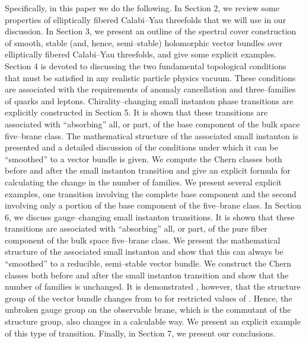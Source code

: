 \documentclass[a4paper,12pt]{article}
\numberwithin{equation}{section}
\theoremstyle{plain}
\begin{document}
Specifically, in this paper we do the following. In Section 2, we review some
properties of elliptically fibered Calabi--Yau threefolds that we will use in
our discussion. In Section 3, we present an outline of the spectral cover
construction of smooth, stable (and, hence, semi--stable) 
holomorphic \coordHE{} vector bundles over elliptically
fibered Calabi--Yau threefolds, and give some explicit examples. Section 4 is
devoted to discussing the two fundamental topological conditions that must be
satisfied in any realistic particle physics vacuum. These conditions are
associated with the requirements of anomaly cancellation and 
three--families of quarks and leptons. Chirality--changing small instanton
phase transitions are explicitly constructed in Section 5. It is shown that
these transitions are associated with ``absorbing'' all, or part, of the
base component of the bulk space five--brane class. The mathematical
structure of the associated small instanton is presented and 
a detailed discussion of the
conditions under which it can be ``smoothed'' to a vector bundle is
given. We compute the Chern classes both before and after the small
instanton transition and give an explicit formula for calculating the change
in the number of families. We present several explicit examples, one
transition involving the complete base component and the second involving 
only a portion of the base component of the five--brane class. In Section 6,
we discuss gauge--changing small instanton transitions. It is shown that these
transitions are associated with ``absorbing'' all, or part, of the pure fiber
component of the bulk space five--brane class. We present the mathematical
structure of the associated small instanton and show that this can always be
``smoothed'' to a reducible, semi--stable vector bundle. We construct 
the Chern classes both
before and after the small instanton transition and show that the number of
families is unchanged. It is demonstrated   , however, that the structure group of the
vector bundle changes from \coordHE{} to \coordHE{} for restricted
values of \coordHE{}. Hence, the unbroken gauge group on the observable brane, which
is the commutant of the structure group, also changes in a calculable way. We
present an explicit example of this type of transition. Finally, in Section 7,
we present our conclusions.

 

\end{document}
